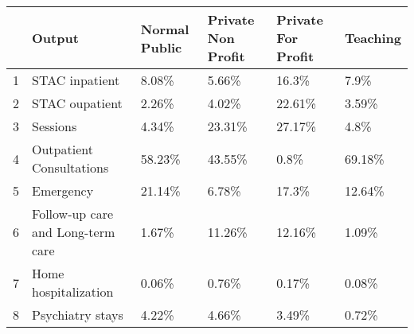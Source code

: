 \begin{tabular}{rlllll}
  \toprule
    & Output                            & Normal Public & Private Non Profit & Private For Profit & Teaching \\
  \midrule
  1 & STAC inpatient                    & 8.08\%        & 5.66\%             & 16.3\%             & 7.9\%    \\
  2 & STAC oupatient                    & 2.26\%        & 4.02\%             & 22.61\%            & 3.59\%   \\
  3 & Sessions                          & 4.34\%        & 23.31\%            & 27.17\%            & 4.8\%    \\
  4 & Outpatient Consultations          & 58.23\%       & 43.55\%            & 0.8\%              & 69.18\%  \\
  5 & Emergency                         & 21.14\%       & 6.78\%             & 17.3\%             & 12.64\%  \\
  6 & Follow-up care and Long-term care & 1.67\%        & 11.26\%            & 12.16\%            & 1.09\%   \\
  7 & Home hospitalization              & 0.06\%        & 0.76\%             & 0.17\%             & 0.08\%   \\
  8 & Psychiatry stays                  & 4.22\%        & 4.66\%             & 3.49\%             & 0.72\%   \\
  \bottomrule
\end{tabular}
